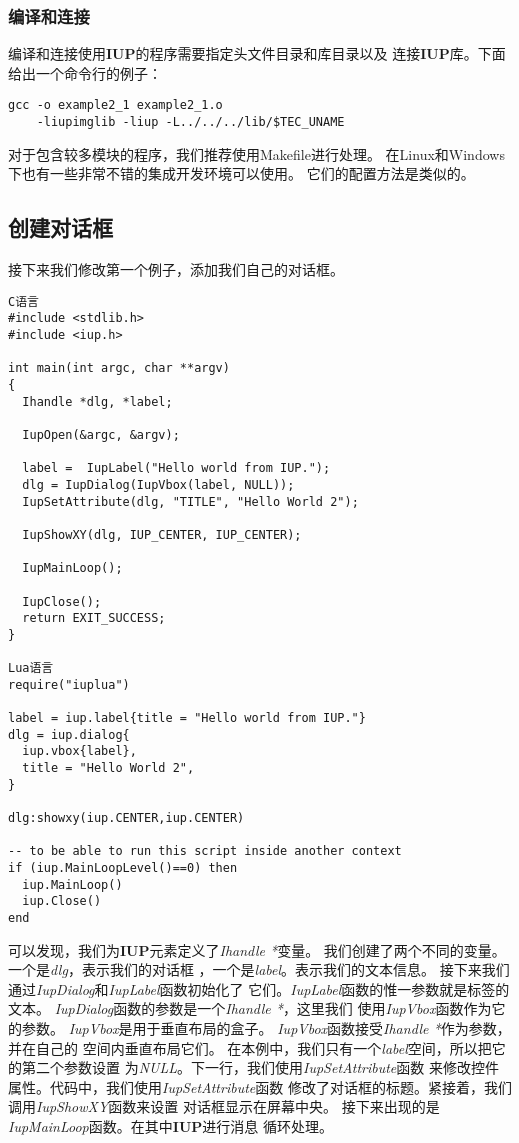 \documentclass{ctexart}
\begin{document}
\subsubsection{编译和连接}

编译和连接使用\textbf{IUP}的程序需要指定头文件目录和库目录以及
连接\textbf{IUP}库。下面给出一个命令行的例子：

\lstset{language=C}
\begin{lstlisting}
gcc -o example2_1 example2_1.o
	-liupimglib -liup -L../../../lib/$TEC_UNAME
\end{lstlisting}

对于包含较多模块的程序，我们推荐使用Makefile进行处理。
在Linux和Windows下也有一些非常不错的集成开发环境可以使用。
它们的配置方法是类似的。

\subsection{创建对话框}

接下来我们修改第一个例子，添加我们自己的对话框。

\lstset{language=C}
\begin{lstlisting}
C语言
#include <stdlib.h>
#include <iup.h>

int main(int argc, char **argv)
{
  Ihandle *dlg, *label;

  IupOpen(&argc, &argv);

  label =  IupLabel("Hello world from IUP.");
  dlg = IupDialog(IupVbox(label, NULL));
  IupSetAttribute(dlg, "TITLE", "Hello World 2");

  IupShowXY(dlg, IUP_CENTER, IUP_CENTER);

  IupMainLoop();

  IupClose();
  return EXIT_SUCCESS;
}

Lua语言
require("iuplua")

label = iup.label{title = "Hello world from IUP."}
dlg = iup.dialog{
  iup.vbox{label},
  title = "Hello World 2",
}

dlg:showxy(iup.CENTER,iup.CENTER)

-- to be able to run this script inside another context
if (iup.MainLoopLevel()==0) then
  iup.MainLoop()
  iup.Close()
end
\end{lstlisting}

可以发现，我们为\textbf{IUP}元素定义了\emph{Ihandle *}变量。
我们创建了两个不同的变量。一个是\emph{dlg}，表示我们的对话框
，一个是\emph{label}。表示我们的文本信息。
接下来我们通过\emph{IupDialog}和\emph{IupLabel}函数初始化了
它们。\emph{IupLabel}函数的惟一参数就是标签的文本。
\emph{IupDialog}函数的参数是一个\emph{Ihandle *}，这里我们
使用\emph{IupVbox}函数作为它的参数。
\emph{IupVbox}是用于垂直布局的盒子。
\emph{IupVbox}函数接受\emph{Ihandle *}作为参数，并在自己的
空间内垂直布局它们。
在本例中，我们只有一个\emph{label}空间，所以把它的第二个参数设置
为\emph{NULL}。下一行，我们使用\emph{IupSetAttribute}函数
来修改控件属性。代码中，我们使用\emph{IupSetAttribute}函数
修改了对话框的标题。紧接着，我们调用\emph{IupShowXY}函数来设置
对话框显示在屏幕中央。
接下来出现的是\emph{IupMainLoop}函数。在其中\textbf{IUP}进行消息
循环处理。
\end{document}
